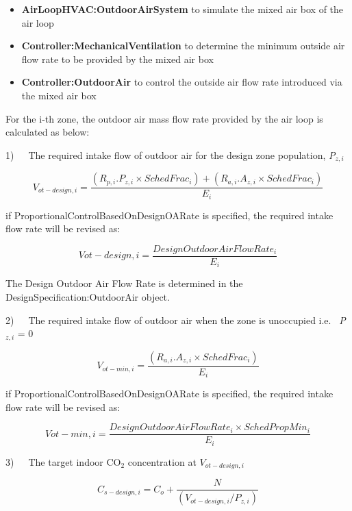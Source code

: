 \begin{itemize}
  \item \textbf{AirLoopHVAC:OutdoorAirSystem} to simulate the mixed air box of the air loop
  \item \textbf{Controller:MechanicalVentilation} to determine the minimum outside air flow rate to be provided by the mixed air box
  \item \textbf{Controller:OutdoorAir} to control the outside air flow rate introduced via the mixed air box
\end{itemize}

For the i-th zone, the outdoor air mass flow rate provided by the air loop is calculated as below:

1)~~~The required intake flow of outdoor air for the design zone population, \emph{P\(_{z,i}\)}

\begin{equation}
{V_{ot - design,i}} = \frac{{\left( {{R_{p,i}}.{P_{z,i}} \times {SchedFrac_i}} \right) + ({R_{a,i}}.{A_{z,i}} \times {SchedFrac_i})}}{{{E_i}}}
\end{equation}

if ProportionalControlBasedOnDesignOARate is specified, the required intake flow rate will be revised as:

 \begin{equation} {V{ot - design,i}} = \frac{Design Outdoor Air Flow Rate_i} {E_i} \end{equation}

The Design Outdoor Air Flow Rate is determined in the DesignSpecification:OutdoorAir object. 

2)~~~The required intake flow of outdoor air when the zone is unoccupied i.e.~ \emph{P\(_{z,i}\)} = 0

\begin{equation}
{V_{ot - min,i}} = \frac{{({R_{a,i}}.{A_{z,i}} \times {SchedFrac_i})}}{{{E_i}}}
\end{equation}

if ProportionalControlBasedOnDesignOARate is specified, the required intake flow rate will be revised as:

 \begin{equation} {V{ot - min,i}} = \frac{ {Design Outdoor Air Flow Rate_i} \times {SchedPropMin_i} } {E_i} \end{equation}


3)~~~The target indoor CO\(_{2}\) concentration at \({V_{ot - design,i}}\)

\begin{equation}
{C_{s - design,i}} = {C_o} + \frac{N}{{\left( {{V_{ot - design,i}}/{P_{z,i}}} \right)}}
\end{equation}

